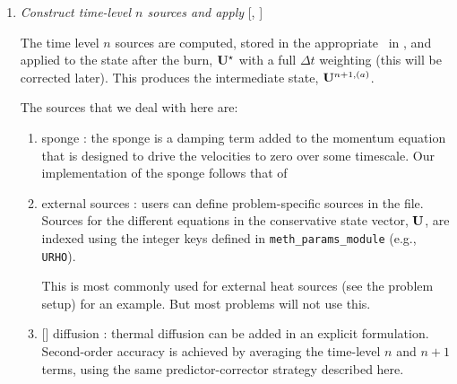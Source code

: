 \begin{enumerate}
  The reaction data needs to be valid in the ghost cells.  The logic
  in this routine (accomplished throuh the use of a mask) will burn
  only in the valid interior cells or in any ghost cells that are on a
  coarse-fine interface or physical boundary  This allows us to just use a level {\tt
    FillBoundary} call to fill all of the ghost cells on the same
  level with valid data.

  An experimental option (enabled via
  ) will create a custom
  distribution map based on the work needed in burning a zone and
  redistribute the boxes across processors before burning, to better
  load balance..  

  At the end of this step,  sees the effects of the
  reactions.


\item \label{strang:oldsource} {\em Construct time-level $n$ sources and apply} 
  [, ]

  The time level $n$ sources are computed, stored in the appropriate
  \multifab\ in , and applied to the state
  after the burn, ${\bf U}^\star$ with a full $\Delta t$ weighting (this
  will be corrected later).  This produces the intermediate state,
  ${\bf U}^{n+1,(a)}$.

  The sources that we deal with here are:
  \begin{enumerate}
  \item sponge : the sponge is a damping term added to
    the momentum equation that is designed to drive the velocities to
    zero over some timescale.  Our implementation of the sponge
    follows that of \maestro~\cite{maestro:III}

  \item external sources : users can define problem-specific sources
    in the  file.  Sources for the different
    equations in the conservative state vector, ${\bf U}$, are indexed
    using the integer keys defined in {\tt meth\_params\_module}
    (e.g., {\tt URHO}).

    This is most commonly used for external heat sources (see the
     problem setup) for an example.  But most
    problems will not use this.

  \item {[]} diffusion : thermal diffusion can be
    added in an explicit formulation.  Second-order accuracy is
    achieved by averaging the time-level $n$ and $n+1$ terms, using
    the same predictor-corrector strategy described here.


\end{enumerate}
\end{enumerate}
